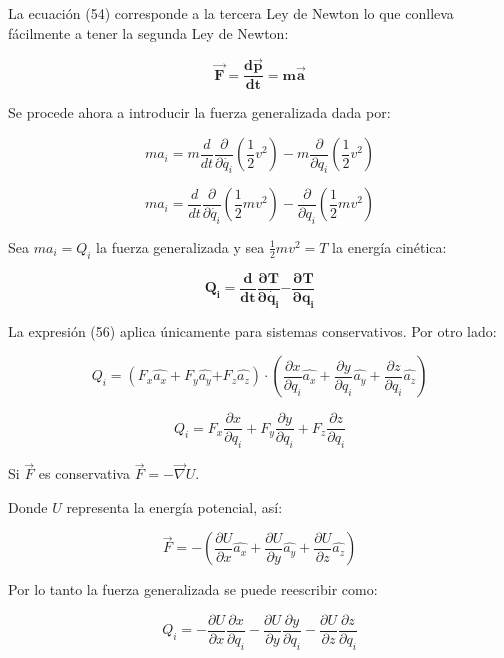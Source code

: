 \documentclass[]{article}
\begin{document}
La ecuación (54) corresponde a la tercera Ley de Newton lo que conlleva
fácilmente a tener la segunda Ley de Newton:

\[\overrightarrow{\mathbf{F}}\mathbf{=}\frac{\mathbf{d}\overrightarrow{\mathbf{p}}}{\mathbf{dt}}\mathbf{= m}\overrightarrow{\mathbf{a}}\]

Se procede ahora a introducir la fuerza generalizada dada por:

\[ma_{i} = m\frac{d}{dt}\frac{\partial}{\partial\dot{q_{i}}}\left( \frac{1}{2}v^{2} \right) - m\frac{\partial}{\partial q_{i}}\left( \frac{1}{2}v^{2} \right)\]

\[ma_{i} = \frac{d}{dt}\frac{\partial}{\partial\dot{q_{i}}}\left( \frac{1}{2}{mv}^{2} \right) - \frac{\partial}{\partial q_{i}}\left( \frac{1}{2}{mv}^{2} \right)\]

Sea \(ma_{i} = Q_{i}\) la fuerza generalizada y sea
\(\frac{1}{2}{mv}^{2} = T\) la energía cinética:

\[\mathbf{Q}_{\mathbf{i}}\mathbf{=}\frac{\mathbf{d}}{\mathbf{dt}}\frac{\mathbf{\partial T}}{\mathbf{\partial}\dot{\mathbf{q}_{\mathbf{i}}}}\mathbf{-}\frac{\mathbf{\partial T}}{\mathbf{\partial}\mathbf{q}_{\mathbf{i}}}\]

La expresión (56) aplica únicamente para sistemas conservativos. Por
otro lado:

\[Q_{i} = \left( F_{x}\widehat{a_{x}} + F_{y}\widehat{a_{y}}{+ F}_{z}\widehat{a_{z}} \right) \cdot \left( \frac{\partial x}{\partial q_{i}}\widehat{a_{x}} + \frac{\partial y}{\partial q_{i}}\widehat{a_{y}} + \frac{\partial z}{\partial q_{i}}\widehat{a_{z}} \right)\]

\[Q_{i} = F_{x}\frac{\partial x}{\partial q_{i}} + F_{y}\frac{\partial y}{\partial q_{i}} + F_{z}\frac{\partial z}{\partial q_{i}}\]

Si \(\overrightarrow{F}\) es conservativa
\(\overrightarrow{F} = - \overrightarrow{\nabla}U\).

Donde \(U\) representa la energía potencial, así:

\[\overrightarrow{F} = - \left( \frac{\partial U}{\partial x}\widehat{a_{x}} + \frac{\partial U}{\partial y}\widehat{a_{y}} + \frac{\partial U}{\partial z}\widehat{a_{z}} \right)\]

Por lo tanto la fuerza generalizada se puede reescribir como:

\[Q_{i} = - \frac{\partial U}{\partial x}\frac{\partial x}{\partial q_{i}} - \frac{\partial U}{\partial y}\frac{\partial y}{\partial q_{i}} - \frac{\partial U}{\partial z}\frac{\partial z}{\partial q_{i}}\]
\end{document}
